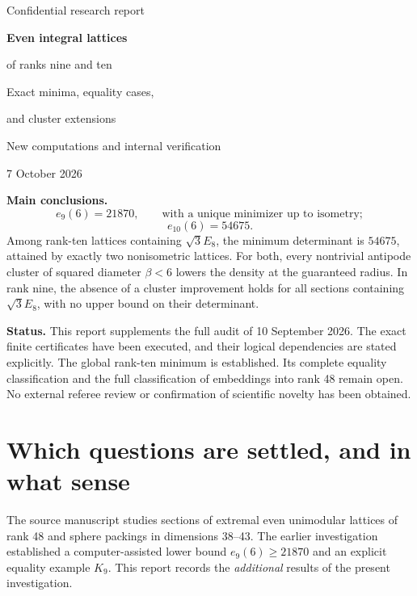 \documentclass[11pt,a4paper]{article}
\theoremstyle{remark}\newtheorem{remark}[theorem]{Remark}
\begin{document}
\begin{titlepage}
\vspace*{18mm}
{\Large\sffamily Confidential research report\par}
\vspace{14mm}
{\huge\bfseries Even integral lattices\par of ranks nine and ten\par}
\vspace{9mm}
{\Large Exact minima, equality cases,\par and cluster extensions\par}
\vspace{12mm}
{\large New computations and internal verification\par 7 October 2026\par}
\vspace{14mm}
\textbf{Main conclusions.}
\[
e_9(6)=21870,\qquad \text{with a unique minimizer up to isometry};
\]
\[
e_{10}(6)=54675.
\]
Among rank-ten lattices containing $\sqrt3E_8$, the minimum determinant is $54675$, attained by exactly two nonisometric lattices. For both, every nontrivial antipode cluster of squared diameter $\beta<6$ lowers the density at the guaranteed radius. In rank nine, the absence of a cluster improvement holds for all sections containing $\sqrt3E_8$, with no upper bound on their determinant.

\vfill
\textbf{Status.} This report supplements the full audit of 10 September 2026. The exact finite certificates have been executed, and their logical dependencies are stated explicitly. The global rank-ten minimum is established. Its complete equality classification and the full classification of embeddings into rank 48 remain open. No external referee review or confirmation of scientific novelty has been obtained.
\end{titlepage}
{\small\tableofcontents}
\newpage

\section{Which questions are settled, and in what sense}

The source manuscript studies sections of extremal even unimodular lattices of rank 48 and sphere packings in dimensions 38--43. The earlier investigation established a computer-assisted lower bound $e_9(6)\ge21870$ and an explicit equality example $K_9$. This report records the \emph{additional} results of the present investigation.
\end{document}
